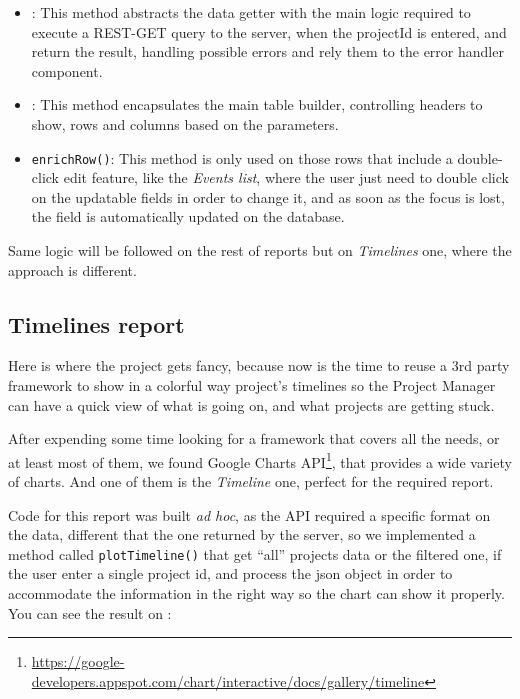 \begin{itemize}
  \item {}: This method abstracts the data getter with the main
  logic required to execute a REST-GET query to the server, when the projectId
  is entered, and return the result, handling possible errors and rely them to
  the error handler component.
  \item {}: This method encapsulates the main table builder,
  controlling headers to show, rows and columns based on the parameters.
  \item \texttt{enrichRow()}: This method is only used on those rows that
  include a double-click edit feature, like the \emph{Events list}, where the
  user just need to double click on the updatable fields in order to change
  it, and as soon as the focus is lost, the field is automatically updated on
  the database.
\end{itemize}

Same logic will be followed on the rest of reports but on \emph{Timelines} one,
where the approach is different.

\subsection{Timelines report}
Here is where the project gets fancy, because now is the time to reuse a 3rd
party framework to show in a colorful way project's timelines so the Project
Manager can have a quick view of what is going on, and what projects are getting
stuck.

After expending some time looking for a framework that covers all the needs, or
at least most of them, we found Google Charts API\footnote{\url{https://google-developers.appspot.com/chart/interactive/docs/gallery/timeline}},
that provides a wide variety of charts. And one of them is the \emph{Timeline}
one, perfect for the required report.

Code for this report was built \emph{ad hoc}, as the API required a specific
format on the data, different that the one returned by the server, so we
implemented a method called \texttt{plotTimeline()} that get ``all'' projects data or the
filtered one, if the user enter a single project id, and process the json object
in order to accommodate the information in the right way so the chart can show
it properly. You can see the result on 
:

